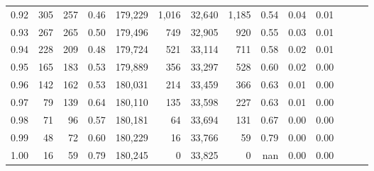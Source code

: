 \begin{tabular}{rrrrrrrrrrrrrr}
0.92 &    305 &  257 &  0.46 &  179,229 &    1,016 &  32,640 &   1,185 &  0.54 &  0.04 &      0.01 \\
0.93 &    267 &  265 &  0.50 &  179,496 &      749 &  32,905 &     920 &  0.55 &  0.03 &      0.01 \\
0.94 &    228 &  209 &  0.48 &  179,724 &      521 &  33,114 &     711 &  0.58 &  0.02 &      0.01 \\
0.95 &    165 &  183 &  0.53 &  179,889 &      356 &  33,297 &     528 &  0.60 &  0.02 &      0.00 \\
0.96 &    142 &  162 &  0.53 &  180,031 &      214 &  33,459 &     366 &  0.63 &  0.01 &      0.00 \\
0.97 &     79 &  139 &  0.64 &  180,110 &      135 &  33,598 &     227 &  0.63 &  0.01 &      0.00 \\
0.98 &     71 &   96 &  0.57 &  180,181 &       64 &  33,694 &     131 &  0.67 &  0.00 &      0.00 \\
0.99 &     48 &   72 &  0.60 &  180,229 &       16 &  33,766 &      59 &  0.79 &  0.00 &      0.00 \\
1.00 &     16 &   59 &  0.79 &  180,245 &        0 &  33,825 &       0 &   nan &  0.00 &      0.00 \\
\bottomrule
\end{tabular}
